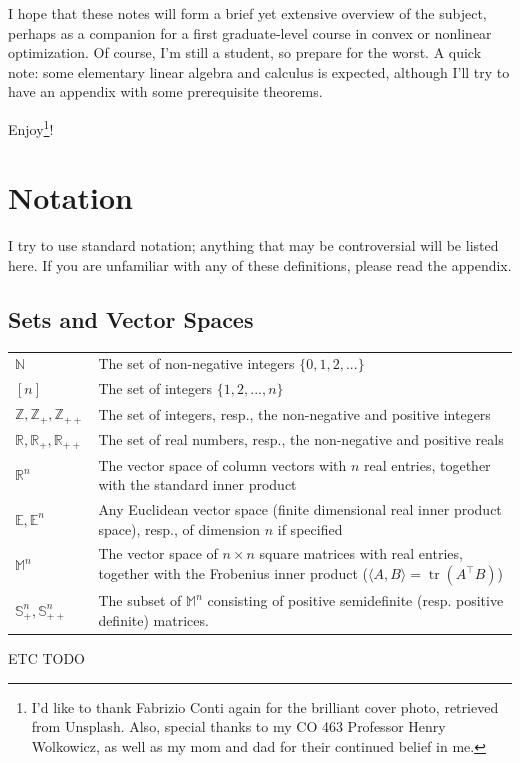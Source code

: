 \documentclass[11pt]{article}
\numberwithin{equation}{section}
\theoremstyle{definition}
\newcommand{\bE}{\mathbb{E}}
\newcommand{\bM}{\mathbb{M}}
\newcommand{\bN}{\mathbb{N}}
\newcommand{\bR}{\mathbb{R}}
\newcommand{\bS}{\mathbb{S}}
\newcommand{\bZ}{\mathbb{Z}}
\newcommand{\ltr}{\operatorname{tr}}
\begin{document}
I hope that these notes will form a brief yet extensive overview of the subject, perhaps as a companion for a first graduate-level course in convex or nonlinear optimization. Of course, I'm still a student, so prepare for the worst. A quick note: some elementary linear algebra and calculus is expected, although I'll try to have an appendix with some prerequisite
theorems.

Enjoy\footnote{I'd like to thank 
Fabrizio Conti again for the brilliant cover photo, retrieved from Unsplash. Also, special thanks to my CO 463 Professor Henry Wolkowicz, as well as my mom and dad for their continued belief in me.}!
\newpage
\tableofcontents
\newpage
\section*{Notation}
I try to use standard notation; anything that may be controversial will be listed here. If you are unfamiliar with any of these definitions, please read the appendix.
\subsection*{Sets and Vector Spaces}
\begin{tabular}{p{2cm}p{11.75cm}}
$\bN$ & The set of non-negative integers $\{0, 1, 2, ...\}$\\
$[n]$ & The set of integers $\{1, 2, ..., n\}$\\
$\bZ, \bZ_+, \bZ_{++}$ & The set of integers, resp., the non-negative and positive integers\\
$\bR, \bR_+, \bR_{++}$ & The set of real numbers, resp., the non-negative and positive reals\\
$\bR^n$ & The vector space of column vectors with $n$ real entries, together with the standard inner product\\
$\bE, \bE^n$ & Any Euclidean vector space (finite dimensional real inner product space), resp., of dimension $n$ if specified\\
$\bM^n$ & The vector space of $n\times n$ square matrices with real entries, together with the Frobenius inner product ($\langle A,B\rangle =\ltr(A^\top B)$)\\
$\bS_+^n, \bS_{++}^n$ & The subset of $\bM^n$ consisting of positive semidefinite (resp. positive definite) matrices.\\
\end{tabular}
ETC TODO
\end{document}
